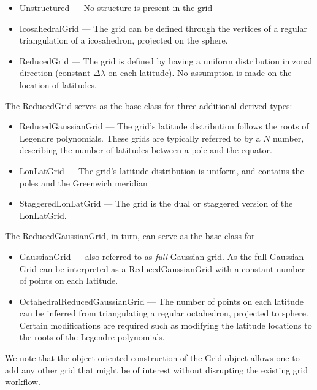 \begin{itemize}
  \setlength\itemsep{0.4em}
  \item Unstructured --- No structure is present in the grid
  \item IcosahedralGrid --- The grid can be defined through the vertices of
        a regular triangulation of a icosahedron, projected on the sphere.
  \item ReducedGrid --- The grid is defined by having a uniform distribution
        in zonal direction (constant $\Delta\lambda$ on each latitude). No
        assumption is made on the location of latitudes.
\end{itemize}
The ReducedGrid serves as the base class for three additional derived types:
\begin{itemize}
  \setlength\itemsep{0.4em}
  \item ReducedGaussianGrid --- The grid's latitude distribution follows the
        roots of Legendre polynomials. These grids are typically referred to
        by a $N$ number, describing the number of latitudes between a pole and
        the equator.
  \item LonLatGrid --- The grid's latitude distribution is uniform, and contains
        the poles and the Greenwich meridian
  \item StaggeredLonLatGrid --- The grid is the dual or staggered version of
        the LonLatGrid.
\end{itemize}
The ReducedGaussianGrid, in turn, can serve as the base class for 
\begin{itemize}
  \item GaussianGrid --- also referred to as \emph{full} Gaussian grid. As the
        full Gaussian Grid can be interpreted as a ReducedGaussianGrid with a
        constant number of points on each latitude.
  \item OctahedralReducedGaussianGrid --- The number of points on each latitude
        can be inferred from triangulating a regular octahedron, projected to
        sphere. Certain modifications are required such as modifying the
        latitude locations to the roots of the Legendre polynomials.
\end{itemize}

We note that the object-oriented construction of the Grid 
object allows one to add any other grid that might be of 
interest without disrupting the existing grid workflow.


